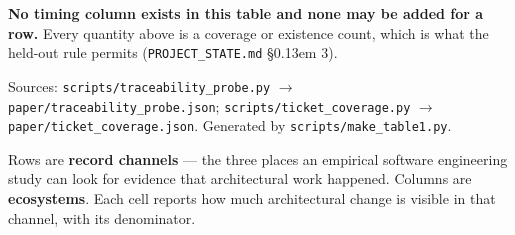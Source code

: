 \documentclass[conference]{IEEEtran}
\begin{document}
\begin{landscape}
\textbf{No timing column exists in this table and none may be added for a \textdagger{} row.} Every quantity above is a coverage or existence count, which is what the held-out rule permits (\texttt{PROJECT\_\allowbreak{}STATE.\allowbreak{}md} \S\kern0.13em 3).



Sources: \texttt{scripts/\allowbreak{}traceability\_\allowbreak{}probe.\allowbreak{}py} $\rightarrow$ \texttt{paper/\allowbreak{}traceability\_\allowbreak{}probe.\allowbreak{}json}; \texttt{scripts/\allowbreak{}ticket\_\allowbreak{}coverage.\allowbreak{}py} $\rightarrow$ \texttt{paper/\allowbreak{}ticket\_\allowbreak{}coverage.\allowbreak{}json}. Generated by \texttt{scripts/\allowbreak{}make\_\allowbreak{}table1.\allowbreak{}py}.



\end{landscape}



Rows are \textbf{record channels} --- the three places an empirical software engineering study can look for evidence that architectural work happened. Columns are \textbf{ecosystems}. Each cell reports how much architectural change is visible in that channel, with its denominator.
\end{document}
